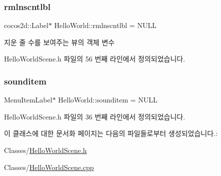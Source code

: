 \subsubsection{\texorpdfstring{rmlnscntlbl}{rmlnscntlbl}}
{\footnotesize\ttfamily cocos2d\+::\+Label$\ast$ Hello\+World\+::rmlnscntlbl = N\+U\+LL\hspace{0.3cm}{\ttfamily [protected]}}



지운 줄 수를 보여주는 뷰의 객체 변수 



Hello\+World\+Scene.\+h 파일의 56 번째 라인에서 정의되었습니다.

\mbox{\label{class_hello_world_adb09915c0ac4077d51f46e2645bc4c0a}} 
\subsubsection{\texorpdfstring{sounditem}{sounditem}}
{\footnotesize\ttfamily Menu\+Item\+Label$\ast$ Hello\+World\+::sounditem = N\+U\+LL}



Hello\+World\+Scene.\+h 파일의 36 번째 라인에서 정의되었습니다.



이 클래스에 대한 문서화 페이지는 다음의 파일들로부터 생성되었습니다.\+:\begin{DoxyCompactItemize}
\item 
Classes/\hyperlink{_hello_world_scene_8h}{Hello\+World\+Scene.\+h}\item 
Classes/\hyperlink{_hello_world_scene_8cpp}{Hello\+World\+Scene.\+cpp}\end{DoxyCompactItemize}
